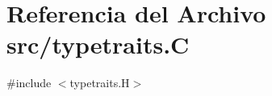 \hypertarget{typetraits_8_c}{}\section{Referencia del Archivo src/typetraits.C}
\label{typetraits_8_c}
{\ttfamily \#include $<$typetraits.\+H$>$}\newline
